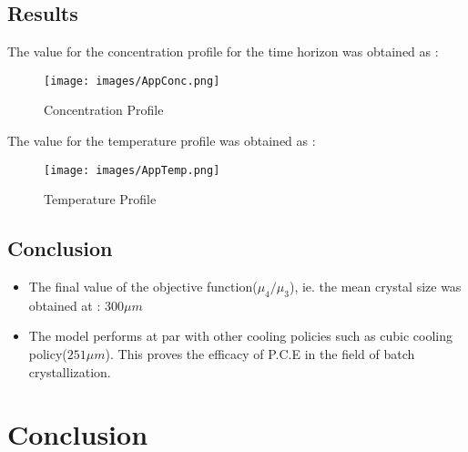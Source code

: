 \documentclass[3p,times,authoryear]{elsarticle}
\begin{document}
\subsection{Results}
The value for the concentration profile for the time horizon was obtained as :
\begin{figure}[h!] 
\begin{center}

\texttt{[image: images/AppConc.png]}
\end{center}
\caption{Concentration Profile}
\end{figure}

The value for the temperature profile was obtained as :
\begin{figure}[h!] 
\begin{center}
\texttt{[image: images/AppTemp.png]}
\end{center}
\caption{Temperature Profile}
\end{figure}

\subsection{Conclusion}

\begin{itemize}
\item The final value of the objective function($\mu_{4}/\mu_{3}$), ie. the mean crystal size was obtained at : $300 \mu m$
\item The model performs at par with other cooling policies such as cubic cooling policy($251 \mu m$)\cite{bhoi}. This proves the efficacy of P.C.E in the field of batch crystallization.
\end{itemize}


\section{Conclusion}






\end{document}
